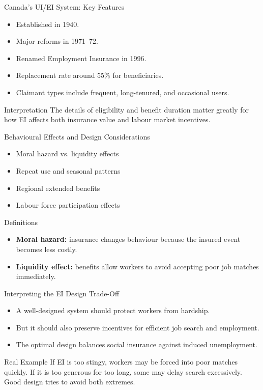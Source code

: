 \documentclass[aspectratio=169]{beamer}
\begin{document}
\begin{frame}{Canada's UI/EI System: Key Features}
\transfade
\begin{itemize}
  \item Established in 1940.
  \item Major reforms in 1971--72.
  \item Renamed Employment Insurance in 1996.
  \item Replacement rate around 55\% for beneficiaries.
  \item Claimant types include frequent, long-tenured, and occasional users.
\end{itemize}

\begin{block}{Interpretation}
The details of eligibility and benefit duration matter greatly for how EI affects both insurance value and labour market incentives.
\end{block}
\end{frame}

\begin{frame}{Behavioural Effects and Design Considerations}
\transfade
\begin{itemize}
  \item Moral hazard vs. liquidity effects
  \item Repeat use and seasonal patterns
  \item Regional extended benefits
  \item Labour force participation effects
\end{itemize}

\begin{block}{Definitions}
\begin{itemize}
  \item \textbf{Moral hazard:} insurance changes behaviour because the insured event becomes less costly.
  \item \textbf{Liquidity effect:} benefits allow workers to avoid accepting poor job matches immediately.
\end{itemize}
\end{block}
\end{frame}

\begin{frame}{Interpreting the EI Design Trade-Off}
\transfade
\begin{itemize}
  \item A well-designed system should protect workers from hardship.
  \item But it should also preserve incentives for efficient job search and employment.
  \item The optimal design balances social insurance against induced unemployment.
\end{itemize}

\begin{exampleblock}{Real Example}
If EI is too stingy, workers may be forced into poor matches quickly. If it is too generous for too long, some may delay search excessively. Good design tries to avoid both extremes.
\end{exampleblock}
\end{frame}
\end{document}
